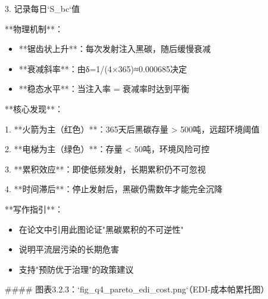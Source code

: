 \documentclass[a4paper,12pt]{article}
\begin{document}
\par
3. 记录每日`S\_bc`值

\par
**物理机制**：

\par
\begin{itemize}
\item **锯齿状上升**：每次发射注入黑碳，随后缓慢衰减
\end{itemize}
\begin{itemize}
\item **衰减斜率**：由δ=1/(4×365)≈0.000685决定
\end{itemize}
\begin{itemize}
\item **稳态水平**：当注入率 = 衰减率时达到平衡
\end{itemize}
**核心发现**：

\par
1. **火箭为主（红色）**：365天后黑碳存量 > 500吨，远超环境阈值

\par
2. **电梯为主（绿色）**：存量 < 50吨，环境风险可控

\par
3. **累积效应**：即使低频发射，长期累积仍不可忽视

\par
4. **时间滞后**：停止发射后，黑碳仍需数年才能完全沉降

\par
**写作指引**：

\par
\begin{itemize}
\item 在论文中引用此图论证"黑碳累积的不可逆性"
\end{itemize}
\begin{itemize}
\item 说明平流层污染的长期危害
\end{itemize}
\begin{itemize}
\item 支持"预防优于治理"的政策建议
\end{itemize}
#### 图表3.2.3：`fig\_q4\_pareto\_edi\_cost.png`（EDI-成本帕累托图）
\end{document}
